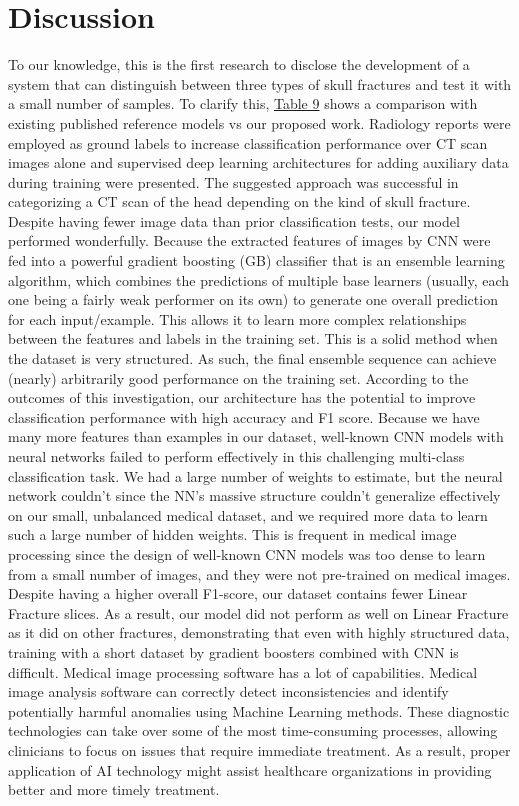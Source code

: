 \documentclass[sigconf]{acmart}
\begin{document}
\section{Discussion}
To our knowledge, this is the first research to disclose the development of a system that can distinguish between three types of skull fractures and test it with a small number of samples. To clarify this, \hyperref[tab:9]{Table 9} shows a comparison with existing published reference models vs our proposed work. Radiology reports were employed as ground labels to increase classification performance over CT scan images alone and supervised deep learning architectures for adding auxiliary data during training were presented. The suggested approach was successful in categorizing a CT scan of the head depending on the kind of skull fracture.  Despite having fewer image data than prior classification tests, our model performed wonderfully. Because the extracted features of images by CNN were fed into a powerful gradient boosting (GB) classifier that is an ensemble learning algorithm, which combines the predictions of multiple base learners (usually, each one being a fairly weak performer on its own) to generate one overall prediction for each input/example. This allows it to learn more complex relationships between the features and labels in the training set. This is a solid method when the dataset is very structured. As such, the final ensemble sequence can achieve (nearly) arbitrarily good performance on the training set. According to the outcomes of this investigation, our architecture has the potential to improve classification performance with high accuracy and F1 score. Because we have many more features than examples in our dataset, well-known CNN models with neural networks failed to perform effectively in this challenging multi-class classification task. We had a large number of weights to estimate, but the neural network couldn't since the NN's massive structure couldn't generalize effectively on our small, unbalanced medical dataset, and we required more data to learn such a large number of hidden weights. This is frequent in medical image processing since the design of well-known CNN models was too dense to learn from a small number of images, and they were not pre-trained on medical images. Despite having a higher overall F1-score, our dataset contains fewer Linear Fracture slices. As a result, our model did not perform as well on Linear Fracture as it did on other fractures, demonstrating that even with highly structured data, training with a short dataset by gradient boosters combined with CNN is difficult. Medical image processing software has a lot of capabilities. Medical image analysis software can correctly detect inconsistencies and identify potentially harmful anomalies using Machine Learning methods. These diagnostic technologies can take over some of the most time-consuming processes, allowing clinicians to focus on issues that require immediate treatment. As a result, proper application of AI technology might assist healthcare organizations in providing better and more timely treatment.
\end{document}
